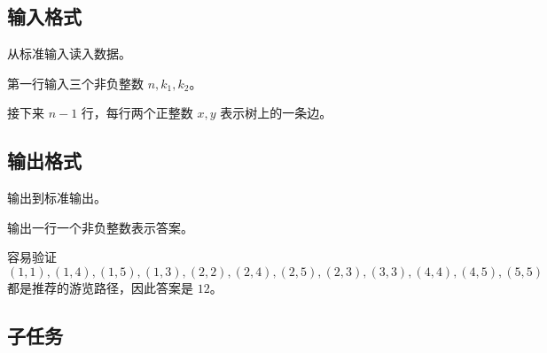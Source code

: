 \subsection*{输入格式}

从标准输入读入数据。

第一行输入三个非负整数 $n,k_1,k_2$。

接下来 $n-1$ 行，每行两个正整数 $x,y$ 表示树上的一条边。

\subsection*{输出格式}

输出到标准输出。

输出一行一个非负整数表示答案。

\examplebox*{}{}

容易验证 $(1,1),(1,4),(1,5),(1,3),(2,2),(2,4),(2,5),(2,3),(3,3),(4,4),(4,5),(5,5)$ 都是推荐的游览路径，因此答案是 $12$。

\subsection*{子任务}

